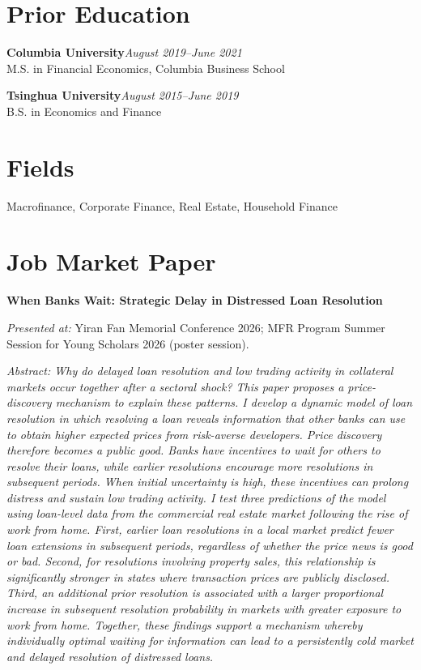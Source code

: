 \documentclass[11pt,letterpaper]{article}
\newenvironment{sectionbody}{%
  \begin{list}{}{\setlength{\leftmargin}{0.18in}\setlength{\rightmargin}{0pt}%
    \setlength{\topsep}{0pt}\setlength{\partopsep}{0pt}%
    \setlength{\parsep}{3pt}\setlength{\itemsep}{0pt}}\item[]%
}{\end{list}}
\newcommand{\education}[3]{%
  \textbf{#1}\hfill\textit{#2}\\#3\par
}
\newcommand{\paperabstract}[1]{\par\begingroup\small\itshape Abstract: #1\par\endgroup}
\begin{document}
\section*{Prior Education}
\begin{sectionbody}
  \education{Columbia University}{August 2019--June 2021}{%
    M.S. in Financial Economics, Columbia Business School}
  \vspace{3pt}
  \education{Tsinghua University}{August 2015--June 2019}{%
    B.S. in Economics and Finance}
\end{sectionbody}

\section*{Fields}
\begin{sectionbody}
  Macrofinance, Corporate Finance, Real Estate, Household Finance
\end{sectionbody}

\newpage

\section*{Job Market Paper}
\begin{sectionbody}
  \textbf{When Banks Wait: Strategic Delay in Distressed Loan Resolution}
  \par {\small \textit{Presented at:} Yiran Fan Memorial Conference 2026;
  MFR Program Summer Session for Young Scholars 2026 (poster session).\par}
  \paperabstract{Why do delayed loan resolution and low trading activity in
  collateral markets occur together after a sectoral shock? This paper proposes
  a price-discovery mechanism to explain these patterns. I develop a dynamic
  model of loan resolution in which resolving a loan reveals information that
  other banks can use to obtain higher expected prices from risk-averse
  developers. Price discovery therefore becomes a public good. Banks have
  incentives to wait for others to resolve their loans, while earlier resolutions
  encourage more resolutions in subsequent periods. When initial uncertainty is
  high, these incentives can prolong distress and sustain low trading activity.
  I test three predictions of the model using loan-level data from the commercial
  real estate market following the rise of work from home. First, earlier loan
  resolutions in a local market predict fewer loan extensions in subsequent
  periods, regardless of whether the price news is good or bad. Second, for
  resolutions involving property sales, this relationship is significantly
  stronger in states where transaction prices are publicly disclosed. Third, an
  additional prior resolution is associated with a larger proportional increase
  in subsequent resolution probability in markets with greater exposure to work
  from home. Together, these findings support a mechanism whereby individually
  optimal waiting for information can lead to a persistently cold market and
  delayed resolution of distressed loans.}
\end{sectionbody}
\end{document}

